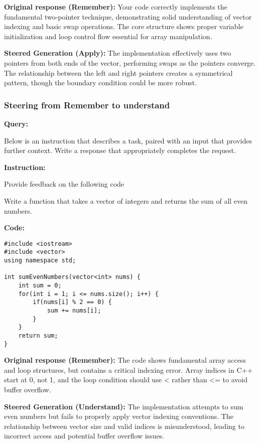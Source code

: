 {\textbf{Original response (Remember):} Your code correctly implements the fundamental two-pointer technique, demonstrating solid understanding of vector indexing and basic swap operations. The core structure shows proper variable initialization and loop control flow essential for array manipulation.}

\textbf{Steered Generation (Apply):} The implementation effectively uses two pointers from both ends of the vector, performing swaps as the pointers converge. The relationship between the left and right pointers creates a symmetrical pattern, though the boundary condition could be more robust.



\subsubsection*{Steering from Remember to understand}



\textbf{Query:}\par
Below is an instruction that describes a task, paired with an input that provides further context. Write a response that appropriately completes the request.

\par

\textbf{Instruction:}\par
Provide feedback on the following code\par
Write a function that takes a vector of integers and returns the sum of all even numbers.

\textbf{Code:}
\begin{lstlisting}
#include <iostream>
#include <vector>
using namespace std;

int sumEvenNumbers(vector<int> nums) {  
    int sum = 0;
    for(int i = 1; i <= nums.size(); i++) {  
        if(nums[i] % 2 == 0) {
            sum += nums[i];
        }
    }
    return sum;
}
\end{lstlisting}

{\textbf{Original response (Remember):} The code shows fundamental array access and loop structures, but contains a critical indexing error. Array indices in C++ start at 0, not 1, and the loop condition should use < rather than <= to avoid buffer overflow.}

\textbf{Steered Generation (Understand):} The implementation attempts to sum even numbers but fails to properly apply vector indexing conventions. The relationship between vector size and valid indices is misunderstood, leading to incorrect access and potential buffer overflow issues.



